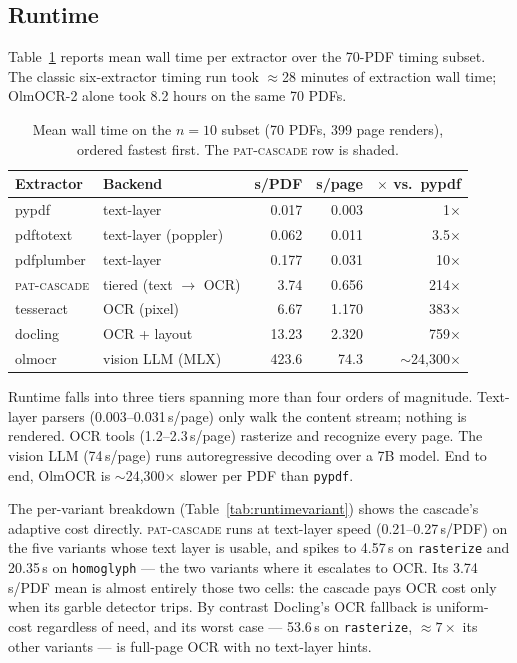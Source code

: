 \documentclass[11pt]{article}
\newcommand{\variant}[1]{\texttt{#1}}
\begin{document}
\subsection{Runtime}
\label{sec:runtime}

Table~\ref{tab:runtime} reports mean wall time per extractor over the
70-PDF timing subset. The classic six-extractor timing run took
$\approx$28 minutes of extraction wall time; OlmOCR-2 alone took 8.2
hours on the same 70 PDFs.

\begin{table}[tbp]
\centering
\caption{Mean wall time on the $n=10$ subset (70 PDFs, 399 page
  renders), ordered fastest first. The \textsc{pat-cascade} row is
  shaded.}
\label{tab:runtime}
\small
\setlength{\tabcolsep}{7pt}
\begin{tabular}{@{}l l r r r@{}}
\toprule
\textbf{Extractor} & \textbf{Backend} & \textbf{s/PDF} &
  \textbf{s/page} & \textbf{$\times$ vs.\ pypdf}\\
\midrule
pypdf       & text-layer            & 0.017 & 0.003 & 1$\times$\\
pdftotext   & text-layer (poppler)  & 0.062 & 0.011 & 3.5$\times$\\
pdfplumber  & text-layer            & 0.177 & 0.031 & 10$\times$\\
\rowcolor{patrow}
\textsc{pat-cascade} & tiered (text $\rightarrow$ OCR)
                                    & 3.74  & 0.656 & 214$\times$\\
tesseract   & OCR (pixel)           & 6.67  & 1.170 & 383$\times$\\
docling     & OCR + layout          & 13.23 & 2.320 & 759$\times$\\
olmocr      & vision LLM (MLX)      & 423.6 & 74.3  & $\sim$24{,}300$\times$\\
\bottomrule
\end{tabular}
\end{table}

Runtime falls into three tiers spanning more than four orders of
magnitude. Text-layer parsers (0.003--0.031\,s/page) only walk the
content stream; nothing is rendered. OCR tools (1.2--2.3\,s/page)
rasterize and recognize every page. The vision LLM (74\,s/page) runs
autoregressive decoding over a 7B model. End to end, OlmOCR is
$\sim$24{,}300$\times$ slower per PDF than \texttt{pypdf}.

The per-variant breakdown (Table~\ref{tab:runtimevariant}) shows the
cascade's adaptive cost directly. \textsc{pat-cascade} runs at
text-layer speed (0.21--0.27\,s/PDF) on the five variants whose text
layer is usable, and spikes to 4.57\,s on \variant{rasterize} and
20.35\,s on \variant{homoglyph} --- the two variants where it escalates
to OCR. Its 3.74\,s/PDF mean is almost entirely those two cells: the
cascade pays OCR cost only when its garble detector trips. By contrast
Docling's OCR fallback is uniform-cost regardless of need, and its worst
case --- 53.6\,s on \variant{rasterize}, $\approx 7\times$ its other
variants --- is full-page OCR with no text-layer hints.
\end{document}
